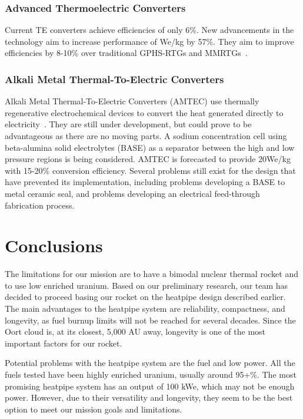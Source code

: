 \documentclass{article}
\begin{document}
\subsubsection{Advanced Thermoelectric Converters}

Current TE converters achieve efficiencies of only 6\%. New advancements in the technology aim to increase performance of We/kg by 57\%. They aim to improve efficiencies by 8-10\% over traditional GPHS-RTGs and MMRTGs~\cite{mondt2002advanced}.

\subsubsection{Alkali Metal Thermal-To-Electric Converters}

Alkali Metal Thermal-To-Electric Converters (AMTEC) use thermally regenerative electrochemical devices to convert the heat generated directly to electricity~\cite{spence2003development}. They are still under development, but could prove to be advantageous as there are no moving parts. A sodium concentration cell using beta-alumina solid electrolytes (BASE) as a separator between the high and low pressure regions is being considered. AMTEC is forecasted to provide 20We/kg with 15-20\% conversion efficiency. Several problems still exist for the design that have prevented its implementation, including problems developing a BASE to metal ceramic seal, and problems developing an electrical feed-through fabrication process. 










\section{Conclusions}

The limitations for our mission are to have a bimodal nuclear thermal rocket and to use low enriched uranium. Based on our preliminary research, our team has decided to proceed basing our rocket on the heatpipe design described earlier. The main advantages to the heatpipe system are reliability, compactness, and longevity, as fuel burnup limits will not be reached for several decades. Since the Oort
cloud is, at its closest, 5,000 AU away, longevity is one of the most important factors for our rocket.

Potential problems with the heatpipe system are the fuel and low power. All the fuels tested have been highly enriched uranium, usually around 95+\%. The most promising heatpipe system has an output of 100 kWe, which may not be enough power. However, due to their versatility and longevity, they seem to be the best option to meet our mission goals and limitations.
\end{document}
